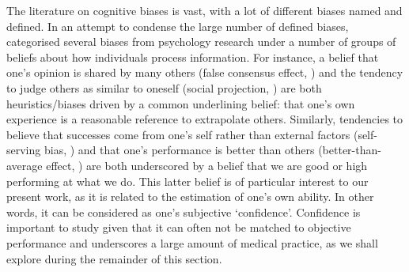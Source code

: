 \documentclass[a4paper, nobind]{templates/ociamthesis}
\begin{document}
\hfill\break
The literature on cognitive biases is vast, with a lot of different biases named and defined. In an attempt to condense the large number of defined biases, \textcite{oeberst_toward_2023} categorised several biases from psychology research under a number of groups of beliefs about how individuals process information. For instance, a belief that one's opinion is shared by many others (false consensus effect, \autocite{nickerson_how_1999}) and the tendency to judge others as similar to oneself (social projection, \autocite{robbins_social_2005}) are both heuristics/biases driven by a common underlining belief: that one's own experience is a reasonable reference to extrapolate others. Similarly, tendencies to believe that successes come from one's self rather than external factors (self-serving bias, \autocite{mullen_self-serving_1988}) and that one's performance is better than others (better-than-average effect, \autocite{alicke_better-than-average_2005}) are both underscored by a belief that we are good or high performing at what we do. This latter belief is of particular interest to our present work, as it is related to the estimation of one's own ability. In other words, it can be considered as one's subjective `confidence'. Confidence is important to study given that it can often not be matched to objective performance and underscores a large amount of medical practice, as we shall explore during the remainder of this section.
\end{document}
